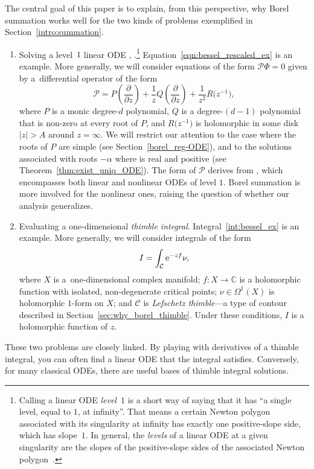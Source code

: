 \documentclass[pdftex]{sigma}
\newcommand{\maps}{\colon}
\newcommand{\C}{\mathbb{C}}
\numberwithin{equation}{section}
\begin{document}
The central goal of this paper is to explain, from this perspective, why Borel summation works well for the two kinds of problems exemplified in Section~\ref{intro:summation}.
\begin{enumerate}\itemsep=0pt
\item[(1)] Solving a level~$1$ linear ODE \cite[Section 2.1]{EcalleIII}, \cite[Section~5.2.2.1]{diverg-resurg-iii}.\footnote{Calling a linear ODE {\em level~$1$} is a short way of saying that it has ``a single level, equal to $1$, at infinity''. That means a certain Newton polygon associated with its singularity at infinity has exactly one positive-slope side, which has slope~$1$. In general, the {\em levels} of a linear ODE at a given singularity are the slopes of the positive-slope sides of the associated Newton polygon~\cite[Proposition~3.3.14]{diverg-resurg--ii}.} Equation~\eqref{eqn:bessel_rescaled_ex} is an example. More generally, we will consider equations of the form $\mathcal{P} \Phi = 0$ given by a~differential operator of the form
\[ \mathcal{P} = P\left(\frac{\partial}{\partial z}\right) + \frac{1}{z} Q\left(\frac{\partial}{\partial z}\right) + \frac{1}{z^2} R\bigl(z^{-1}\bigr), \]
where $P$ is a monic degree-$d$ polynomial, $Q$ is a degree-$(d-1)$ polynomial that is non-zero at every root of $P$, and $R\bigl(z^{-1}\bigr)$ is holomorphic in some disk $|z| > A$ around $z = \infty$. We will restrict our attention to the case where the roots of $P$ are simple (see Section~\ref{borel_reg-ODE}), and to the solutions associated with roots $-\alpha$ where  is real and positive (see Theorem~\ref{thm:exist_uniq_ODE}).
The form of $\mathcal{P}$ derives from \cite[equation~(2.2.3), p.~105]{EcalleIII}, which encompasses both linear and nonlinear ODEs of level $1$. Borel summation is more involved for the nonlinear ones, raising the question of whether our analysis generalizes.
%
\item[(2)] Evaluating a one-dimensional {\em thimble integral}. Integral~\eqref{int:bessel_ex} is an example. More generally, we will consider integrals of the form
\[
I = \int_{\mathcal{C}}{\rm e}^{-zf} \nu,
\]
where $X$ is a~one-dimensional complex manifold; $f \maps X \to \C$ is a holomorphic function with isolated, non-degenerate critical points; $\nu \in \Omega^1(X)$ is holomorphic $1$-form on $X$; and $\mathcal{C}$ is {\em Lefschetz thimble}---a type of contour described in Section~\ref{sec:why_borel_thimble}. Under these conditions, $I$ is a holomorphic function of $z$.
\end{enumerate}
These two problems are closely linked. By playing with derivatives of a thimble integral, you can often find a linear ODE that the integral satisfies. Conversely, for many classical ODEs, there are useful bases of thimble integral solutions.
%
\end{document}
